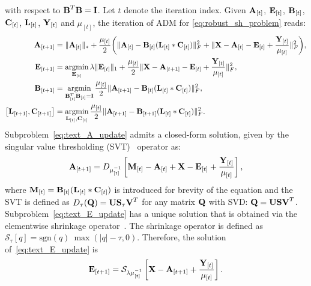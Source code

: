 with respect to $\boldsymbol{\mathbf{B}}^T \boldsymbol{\mathbf{B}} = \boldsymbol{\mathbf{I}}$. Let $t$ denote the iteration index. 
Given $\boldsymbol{\mathbf{A}}_{[t]}$, $\boldsymbol{\mathbf{E}}_{[t]}$, $\boldsymbol{\mathbf{B}}_{[t]}$, $\boldsymbol{\mathbf{C}}_{[t]}$, $\boldsymbol{\mathbf{L}}_{[t]}$, $\boldsymbol{\mathbf{Y}}_{[t]}$
and $\mu_{[t]}$, the iteration of ADM for \cref{eq:robust_sh_problem} reads:
\begin{align}
    \bb{A}_{[t+1]} &= \lVert \bb{A}_{[t]} \rVert_{*} + \frac{\mu_{[t]}}{2} \biggl( \lVert \bb{A}_{[t]} - \bb{B}_{[t]} (\bb{L}_{[t]} \ast \bb{C}_{[t]}) \rVert^{2}_{F} + \lVert \bb{X} - \bb{A}_{[t]} - \bb{E}_{[t]} + \frac{\bb{Y}_{[t]}}{\mu_{[t]}} \rVert_{F}^{2} \biggr), \label{eq:text_A_update} \\
    \bb{E}_{[t+1]} &= \argmin_{\bb{E}_{[t]}} \lambda \lVert \bb{E}_{[t]} \rVert_{1} + \frac{\mu_{[t]}}{2} \lVert \bb{X} - \bb{A}_{[t+1]} - \bb{E}_{[t]} + \frac{\bb{Y}_{[t]}}{\mu_{[t]}} \rVert_{F}^{2}, \label{eq:text_E_update} \\
    \bb{B}_{[t+1]} &= \argmin_{\bb{B}_{[t]}^T \bb{B}_{[t]} = \bb{I}} \frac{\mu_{[t]}}{2} \lVert \bb{A}_{[t+1]} - \bb{B}_{[t]} (\bb{L}_{[t]} \ast \bb{C}_{[t]}) \rVert_{F}^{2}, \label{eq:text_B_update} \\
    \left[ \bb{L}_{[t+1]}, \bb{C}_{[t+1]} \right] &= \argmin_{\bb{L}_{[t]}, \bb{C}_{[t]}} \frac{\mu_{[t]}}{2} \lVert \bb{A}_{[t+1]} - \bb{B}_{[t+1]} (\bb{L}_{[t]} \ast \bb{C}_{[t]}) \rVert_{F}^{2}. \label{eq:text_LC_update}
\end{align}
Subproblem~\eqref{eq:text_A_update} admits a closed-form solution, given by the
singular value thresholding (SVT)~\cite{cai2010singular} operator as:
\begin{equation}\label{eq:text_A_SVT}
    \boldsymbol{\mathbf{A}}_{[t+1]} = D_{\mu_{[t]}^{-1}} \left[ \boldsymbol{\mathbf{M}}_{[t]}  - \boldsymbol{\mathbf{A}}_{[t]} + \boldsymbol{\mathbf{X}} - \boldsymbol{\mathbf{E}}_{[t]} + \frac{\boldsymbol{\mathbf{Y}}_{[t]}}{\mu_{[t]}} \right],
\end{equation}
where $\boldsymbol{\mathbf{M}}_{[t]} = \boldsymbol{\mathbf{B}}_{[t]} (\boldsymbol{\mathbf{L}}_{[t]} \ast \boldsymbol{\mathbf{C}}_{[t]})$ is introduced 
for brevity of the equation and the SVT is defined as
$D_{\tau}(\boldsymbol{\mathbf{Q}}) = \boldsymbol{\mathbf{U}} \boldsymbol{\mathbf{S}}_{\tau} \boldsymbol{\mathbf{V}}^T$ for any matrix $\boldsymbol{\mathbf{Q}}$ with SVD:\@
$\boldsymbol{\mathbf{Q}} = \boldsymbol{\mathbf{U}} \boldsymbol{\mathbf{S}} \boldsymbol{\mathbf{V}}^T$. 
Subproblem~\eqref{eq:text_E_update} has a unique solution that is obtained via 
the elementwise shrinkage operator~\cite{candes2011robust}. The shrinkage operator 
is defined as $\mathcal{S}_{\tau}[q]=\mbox{sgn}(q) \: \max(|q|-\tau, 0)$. 
Therefore, the solution of~\eqref{eq:text_E_update} is
\begin{equation}\label{eq:text_E_shrinkage}
    \boldsymbol{\mathbf{E}}_{[t+1]} = \mathcal{S}_{\lambda \mu_{[t]}^{-1}} \left[ \boldsymbol{\mathbf{X}} - \boldsymbol{\mathbf{A}}_{[t+1]} + \frac{\boldsymbol{\mathbf{Y}}_{[t]}}{\mu_{[t]}} \right].
\end{equation}
